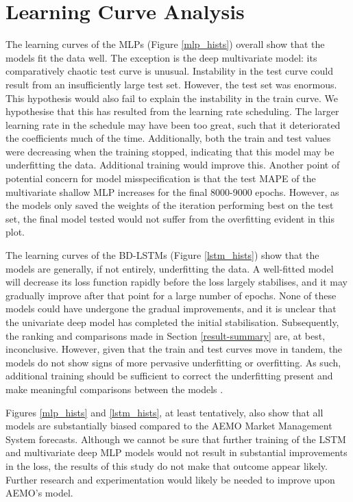 \documentclass[mstat,12pt]{unswthesis}
\begin{document}
\hypertarget{learning-curve-analysis}{%
\section{Learning Curve Analysis}\label{learning-curve-analysis}}

The learning curves of the MLPs (Figure \ref{mlp_hists}) overall show that the models fit the data well. The exception is the deep multivariate model: its comparatively chaotic test curve is unusual. Instability in the test curve could result from an insufficiently large test set. However, the test set was enormous. This hypothesis would also fail to explain the instability in the train curve. We hypothesise that this has resulted from the learning rate scheduling. The larger learning rate in the schedule may have been too great, such that it deteriorated the coefficients much of the time. Additionally, both the train and test values were decreasing when the training stopped, indicating that this model may be underfitting the data. Additional training would improve this. Another point of potential concern for model misspecification is that the test MAPE of the multivariate shallow MLP increases for the final 8000-9000 epochs. However, as the models only saved the weights of the iteration performing best on the test set, the final model tested would not suffer from the overfitting evident in this plot.

The learning curves of the BD-LSTMs (Figure \ref{lstm_hists}) show that the models are generally, if not entirely, underfitting the data. A well-fitted model will decrease its loss function rapidly before the loss largely stabilises, and it may gradually improve after that point for a large number of epochs. None of these models could have undergone the gradual improvements, and it is unclear that the univariate deep model has completed the initial stabilisation. Subsequently, the ranking and comparisons made in Section \ref{result-summary} are, at best, inconclusive. However, given that the train and test curves move in tandem, the models do not show signs of more pervasive underfitting or overfitting. As such, additional training should be sufficient to correct the underfitting present and make meaningful comparisons between the models \cite{Ng2018}.

Figures \ref{mlp_hists} and \ref{lstm_hists}, at least tentatively, also show that all models are substantially biased compared to the AEMO Market Management System forecasts. Although we cannot be sure that further training of the LSTM and multivariate deep MLP models would not result in substantial improvements in the loss, the results of this study do not make that outcome appear likely. Further research and experimentation would likely be needed to improve upon AEMO's model. 
\end{document}
